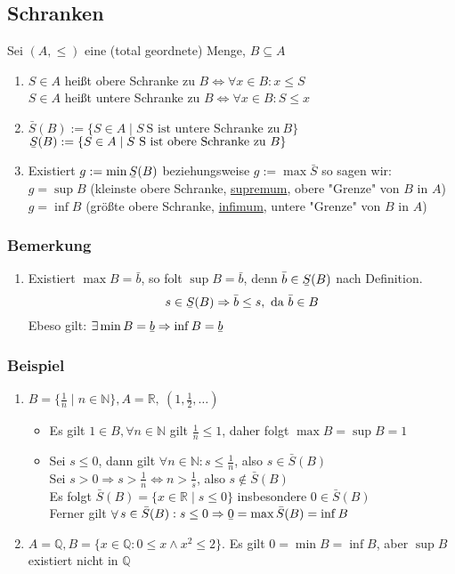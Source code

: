 \documentclass[a4paper]{scrartcl}
\DeclareMathOperator{\Forall}{\forall}%
\newcommand{\ubar}[1]{\text{\b{$#1$}}}
\begin{document}
\subsection{Schranken}
\label{sec-2-8}
Sei $(A,\leq)$ eine (total geordnete) Menge, $B\subseteq A$
\begin{enumerate}
\item $S\in A$ heißt obere Schranke zu $B \Leftrightarrow \Forall x\in B: x\leq S$ \\
      $S\in A$ heißt untere Schranke zu $B \Leftrightarrow \Forall x\in B: S\leq x$
\item $\bar{S}(B):= \{S\in A \mid S~\text{S ist untere Schranke zu}~B\}$ \\
      $\ubar{S}(B):= \{S\in A \mid S~\text{S ist obere Schranke zu}~B\}$
\item Existiert $g:=\min \ubar{S}(B)$ beziehungsweise $g:=\max \bar{S}$ so sagen wir: \\
      $g = \sup B$ (kleinste obere Schranke, \uline{supremum}, obere "Grenze" von $B$ in $A$)
$g = \inf B$ (größte obere Schranke, \uline{infimum}, untere "Grenze" von $B$ in $A$)
\end{enumerate}
\subsubsection{Bemerkung}
\label{sec-2-8-1}
\begin{enumerate}
\item Existiert $\max B = \bar{b}$, so folt $\sup B = \bar{b}$, denn $\bar{b} \in \ubar{S}(B)$ nach Definition.
\[s\in \ubar{S}(B) \Rightarrow \bar{b} \leq s,~\text{da}~\bar{b}\in B\]
Ebeso gilt: $\exists\min B = \ubar{b} \Rightarrow \inf B = \ubar{b}$
\end{enumerate}
\subsubsection{Beispiel}
\label{sec-2-8-2}
\begin{enumerate}
\item $B = \{\frac{1}{n}\mid n\in\mathbb{N}\}, A = \mathbb{R},~(1, \frac{1}{2},\ldots)$
\begin{itemize}
\item Es gilt $1\in B, \Forall n\in\mathbb{N}$ gilt $\frac{1}{n} \leq 1$, daher folgt $\max B = \sup B = 1$
\item Sei $s\leq 0$, dann gilt $\Forall n\in\mathbb{N}: s\leq \frac{1}{n}$, also $s\in \bar{S}(B)$ \\
         Sei $s > 0 \Rightarrow s > \frac{1}{n} \Leftrightarrow n > \frac{1}{s}$, also $s\not\in\bar{S}(B)$ \\
         Es folgt $\bar{S}(B) = \{x\in\mathbb{R}\mid s\leq 0\}$ insbesondere $0\in\bar{S}(B)$ \\
         Ferner gilt $\Forall s\in \bar{S}(B):s\leq 0 \Rightarrow \ubar{0} = \max \bar{S}(B) = \inf B$
\end{itemize}
\item $A = \mathbb{Q}, B = \{x\in\mathbb{Q} : 0 \leq x \wedge x^2 \leq 2\}$. Es gilt $0 = \min B = \inf B$, aber $\sup B$ existiert nicht in $\mathbb{Q}$
\end{enumerate}
\end{document}
